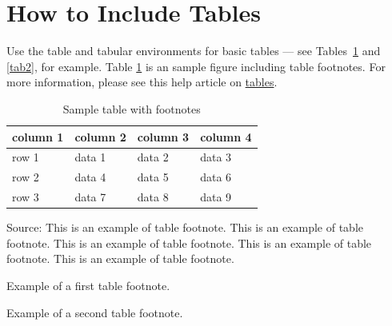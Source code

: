 \documentclass[12pt,a4paper]{article}
\begin{document}
\section{How to Include Tables}\label{sec5}

Use the table and tabular environments for basic tables --- see Tables~\ref{tab1} and \ref{tab2}, for example. Table \ref{tab1} is an sample figure including table footnotes. For more information, please see this help article on \href{https://www.overleaf.com/learn/latex/tables}{tables}. 

\begin{table}[!ht]
\caption{Sample table with footnotes\label{tab1}}
\begin{threeparttable}
\begin{tabular*}{\columnwidth}{@{\extracolsep\fill}llll@{\extracolsep\fill}}
\toprule
column 1 & column 2 & column 3 & column 4\\
\midrule
row 1 & data 1 & data 2 & data 3 \\
row 2 & data 4 & data 5\tnote{1} & data 6 \\
row 3 & data 7 & data 8 & data 9\tnote{2} \\
\bottomrule
\end{tabular*}
\begin{tablenotes}
\item Source: This is an example of table footnote. This is an example of table footnote. This is an example of table footnote. This is an example of table footnote. This is an example of table footnote.
\item[1] Example of a first table footnote.
\item[2] Example of a second table footnote.
\end{tablenotes}
\end{threeparttable}
\end{table}
\end{document}
